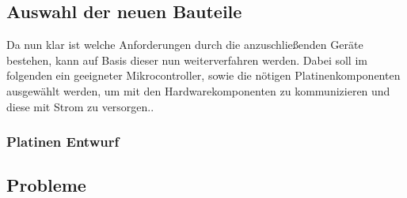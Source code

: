\subsection{Auswahl der neuen Bauteile}
Da nun klar ist welche Anforderungen durch die anzuschließenden Geräte bestehen, kann auf Basis dieser nun weiterverfahren werden. Dabei soll im folgenden ein geeigneter Mikrocontroller, sowie die nötigen Platinenkomponenten ausgewählt werden, um mit den Hardwarekomponenten zu kommunizieren und diese mit Strom zu versorgen..
\subsubsection{Platinen Entwurf}
\subsection{Probleme}